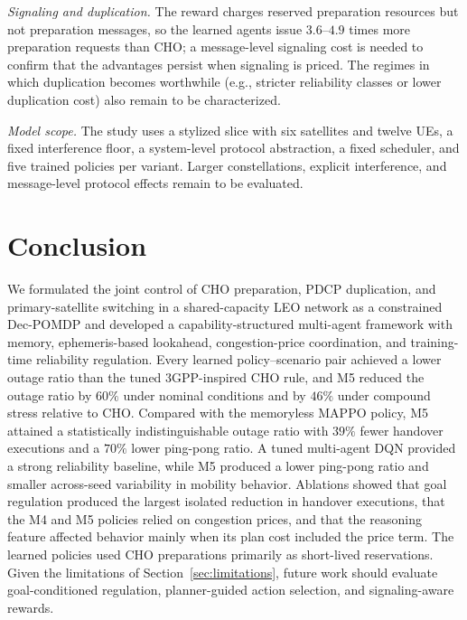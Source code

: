 \documentclass[journal]{IEEEtran}
\begin{document}
\emph{Signaling and duplication.} The reward charges reserved preparation
resources but not preparation messages, so the learned agents issue
$3.6$--$4.9$ times more preparation requests than CHO; a message-level
signaling cost is needed to confirm that the advantages persist when
signaling is priced. The regimes in which duplication becomes worthwhile
(e.g., stricter reliability classes or lower duplication cost) also remain to
be characterized.

\emph{Model scope.} The study uses a stylized slice with six satellites and
twelve UEs, a fixed interference floor, a system-level protocol abstraction,
a fixed scheduler, and five trained policies per variant. Larger
constellations, explicit interference, and message-level protocol effects
remain to be evaluated.

\section{Conclusion}
\label{sec:conclusion}

We formulated the joint control of CHO preparation, PDCP duplication, and
primary-satellite switching in a shared-capacity LEO network as a constrained
Dec-POMDP and developed a capability-structured multi-agent framework with
memory, ephemeris-based lookahead, congestion-price coordination, and
training-time reliability regulation. Every learned policy--scenario pair
achieved a lower outage ratio than the tuned 3GPP-inspired CHO rule, and M5
reduced the outage ratio by $60\%$ under nominal conditions and by $46\%$
under compound stress relative to CHO. Compared with the memoryless MAPPO
policy, M5 attained a statistically indistinguishable outage ratio with $39\%$
fewer handover executions and a $70\%$ lower ping-pong ratio. A tuned
multi-agent DQN provided a strong reliability baseline, while M5 produced a
lower ping-pong ratio and smaller across-seed variability in mobility behavior.
Ablations showed that goal regulation produced the largest isolated reduction in handover executions, that the M4 and M5 policies relied on congestion prices, and that the
reasoning feature affected behavior mainly when its plan cost included the
price term. The learned policies used CHO preparations primarily as short-lived
reservations. Given the limitations of Section~\ref{sec:limitations}, future
work should evaluate goal-conditioned regulation, planner-guided action
selection, and signaling-aware rewards.
\end{document}
